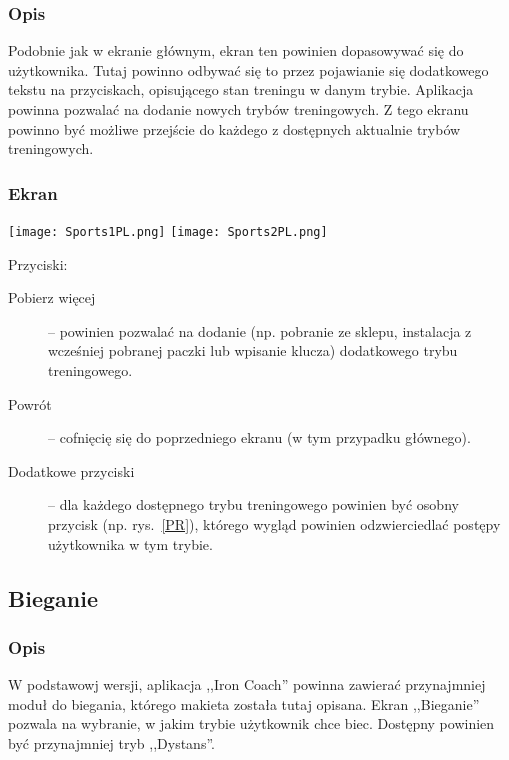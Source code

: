 \subsubsection{Opis}
\noindent Podobnie jak w ekranie głównym, ekran ten powinien dopasowywać się do użytkownika. Tutaj powinno odbywać się to przez pojawianie się dodatkowego tekstu na przyciskach, opisującego stan treningu w danym trybie. Aplikacja powinna pozwalać na dodanie nowych trybów treningowych. Z tego ekranu powinno być możliwe przejście do każdego z dostępnych aktualnie trybów treningowych.
\subsubsection{Ekran}
\begin{minipage}{0.5\textwidth}
  \label{S1}
  \texttt{[image: Sports1PL.png]}
  \label{S2}
  \texttt{[image: Sports2PL.png]}
\end{minipage}
\begin{minipage}{0.5\textwidth}
Przyciski:\\
\begin{description}
  \item[Pobierz więcej] -- powinien pozwalać na dodanie (np. pobranie ze sklepu, instalacja z wcześniej pobranej paczki lub wpisanie klucza) dodatkowego trybu treningowego.
  \item[Powrót] -- cofnięcię się do poprzedniego ekranu (w tym przypadku głównego).
  \item[Dodatkowe przyciski] -- dla każdego dostępnego trybu treningowego powinien być osobny przycisk (np. rys.~\ref{PR}), którego wygląd powinien odzwierciedlać postępy użytkownika w tym trybie.
\end{description}
\end{minipage}
\subsection{Bieganie}
\subsubsection{Opis}
\noindent W podstawowj wersji, aplikacja ,,Iron Coach'' powinna zawierać przynajmniej moduł do biegania, którego makieta została tutaj opisana. Ekran ,,Bieganie'' pozwala na wybranie, w jakim trybie użytkownik chce biec. Dostępny powinien być przynajmniej tryb ,,Dystans''.

